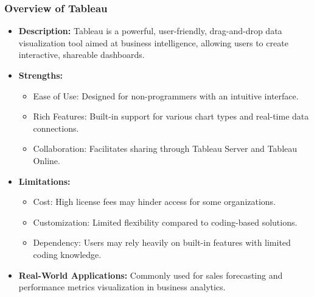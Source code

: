 \documentclass{beamer}
\begin{document}
\begin{frame}[fragile]
    \frametitle{Overview of Tableau}
    \begin{itemize}
        \item \textbf{Description:} Tableau is a powerful, user-friendly, drag-and-drop data visualization tool aimed at business intelligence, allowing users to create interactive, shareable dashboards.
        
        \item \textbf{Strengths:}
        \begin{itemize}
            \item Ease of Use: Designed for non-programmers with an intuitive interface.
            \item Rich Features: Built-in support for various chart types and real-time data connections.
            \item Collaboration: Facilitates sharing through Tableau Server and Tableau Online.
        \end{itemize}
        
        \item \textbf{Limitations:}
        \begin{itemize}
            \item Cost: High license fees may hinder access for some organizations.
            \item Customization: Limited flexibility compared to coding-based solutions.
            \item Dependency: Users may rely heavily on built-in features with limited coding knowledge.
        \end{itemize}

        \item \textbf{Real-World Applications:} Commonly used for sales forecasting and performance metrics visualization in business analytics.
    \end{itemize}
\end{frame}
\end{document}
